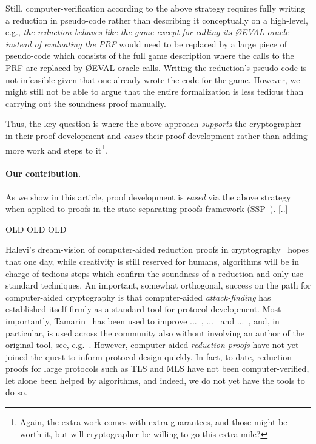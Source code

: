 Still, computer-verification according to the above strategy requires fully writing a reduction in pseudo-code rather than describing it conceptually on a high-level, e.g., \emph{the reduction behaves like the game except for calling its \O{EVAL} oracle instead of evaluating the PRF} would need
to be replaced by a large piece of pseudo-code which consists of the full game description where the calls to the PRF are replaced by \O{EVAL} oracle calls.
Writing the reduction's pseudo-code is not infeasible given that one already
wrote the code for the game. However, we might still not be able to argue that 
the entire formalization is less tedious than carrying out the soundness proof manually.

Thus, the key question is where the above approach \emph{supports} the cryptographer
in their proof development and \emph{eases} their proof development rather than adding more work and steps to it\footnote{Again, the extra work comes with extra guarantees, and those might be worth it, but will cryptographer be willing to go this extra mile?}.

\paragraph{Our contribution.} As we show in this article, proof development is \emph{eased} via the above strategy when applied to proofs in the state-separating proofs framework (SSP~\cite{X}). [..]

\iffalse
\clearpage
OLD OLD OLD



Halevi's dream-vision of computer-aided reduction proofs in cryptography~\cite{Halevi} hopes that one day, while creativity is still reserved for humans, algorithms will be in charge of tedious steps which confirm the soundness of a reduction and only use standard techniques. An important, somewhat orthogonal, success on the path for computer-aided cryptography is that computer-aided \emph{attack-finding} has established itself firmly as a standard tool for protocol development. Most importantly, Tamarin~\cite{X} has been used to improve ...~\cite{X}, ...~\cite{X} and ...~\cite{X}, and, in particular, is used across the community also without involving an author of the original tool, see, e.g.~\cite{X}. However, computer-aided \emph{reduction proofs} have not yet joined the quest to inform protocol design quickly. In fact, to date, reduction proofs for large protocols such as TLS and MLS have not been computer-verified, let alone been helped by algorithms, and indeed, we do not yet have the tools to do so.

